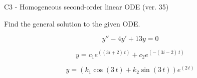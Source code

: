 \begin{exercise}
  \begin{exerciseTitle}C3 - Homogeneous second-order linear ODE (ver. 35)\end{exerciseTitle}
  \begin{exerciseStatement}
    
Find the general solution to the given ODE.

    
\[y''-4y'+13y = 0\]

  \end{exerciseStatement}
  \begin{exerciseAnswer}
    
\[y= c_{1} e^{\left(\left(3 i + 2\right) \, t\right)} + c_{2} e^{\left(-\left(3 i - 2\right) \, t\right)}\]

    
\[y= {\left(k_{1} \cos\left(3 \, t\right) + k_{2} \sin\left(3 \, t\right)\right)} e^{\left(2 \, t\right)}\]

  \end{exerciseAnswer}
\end{exercise}